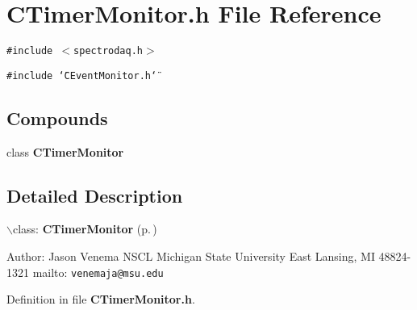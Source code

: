 \section{CTimer\-Monitor.h File Reference}
\label{CTimerMonitor_8h}
{\tt \#include $<$spectrodaq.h$>$}\par
{\tt \#include \char`\"{}CEvent\-Monitor.h\char`\"{}}\par
\subsection*{Compounds}
\begin{CompactItemize}
\item 
class {\bf CTimer\-Monitor}
\end{CompactItemize}


\subsection{Detailed Description}
  $\backslash$class: {\bf CTimer\-Monitor} {\rm (p.\,\pageref{classCTimerMonitor})}

Author: Jason Venema NSCL Michigan State University East Lansing, MI 48824-1321 mailto: {\tt venemaja@msu.edu}



Definition in file {\bf CTimer\-Monitor.h}.